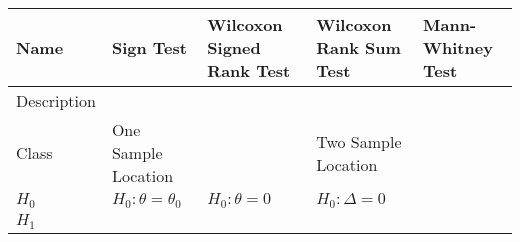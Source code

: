 \documentclass[10pt,a4paper]{article}
\begin{document}
    \begin{table}[]
        \begin{tabular}{|l|l|l|l|l|}
            \hline
            Name               & Sign Test                                        & Wilcoxon Signed Rank Test                                                                                                                     & Wilcoxon Rank Sum Test                                                                                                             & Mann-Whitney Test                                                                                                                                                                           \\ \hline
            Description        &                                                  &                                                                                                                                               &                                                                                                                                    &                                                                                                                                                                                             \\ \hline
            Class              & One Sample Location                              &                                                                                                                                               & Two Sample Location                                                                                                                &                                                                                                                                                                                             \\ \hline
            $H_0$              & $H_{0} : \theta=\theta_{0}$                      & $H_{0} : \theta=0$                                                                                                                            & $H_{0} : \Delta=0$                                                                                                                 &                                                                                                                                                                                             \\ \hline
            $H_1$              &                                                  &                                                                                                                                               &                                                                                                                                    &                                                                                                                                                                                             \\ \hline

\end{tabular}
\end{table}
\end{document}

